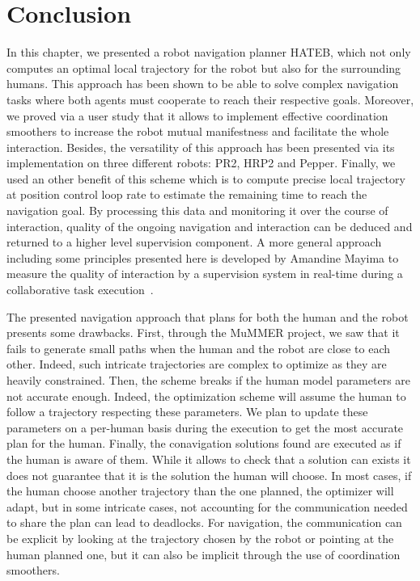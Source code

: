 \documentclass[a4paper,11pt,twoside]{StyleThese}
\begin{document}
\section{Conclusion}

In this chapter, we presented a robot navigation planner HATEB, which not only computes an optimal local trajectory for the robot but also for the surrounding humans. This approach has been shown to be able to solve complex navigation tasks where both agents must cooperate to reach their respective goals. Moreover, we proved via a user study that it allows to implement effective coordination smoothers to increase the robot mutual manifestness and facilitate the whole interaction.
Besides, the versatility of this approach has been presented via its implementation on three different robots: PR2, HRP2 and Pepper.
Finally, we used an other benefit of this scheme which is to compute precise local trajectory at position control loop rate to estimate the remaining time to reach the navigation goal. By processing this data and monitoring it over the course of interaction, quality of the ongoing navigation and interaction can be deduced and returned to a higher level supervision component. A more general approach including some principles presented here is developed by Amandine Mayima to measure the quality of interaction by a supervision system in real-time during a collaborative task execution~\cite{mayima2020toward}.

The presented navigation approach that plans for both the human and the robot presents some drawbacks. First, through the MuMMER project, we saw that it fails to generate small paths when the human and the robot are close to each other. Indeed, such intricate trajectories are complex to optimize as they are heavily constrained. Then, the scheme breaks if the human model parameters are not accurate enough. Indeed, the optimization scheme will assume the human to follow a trajectory respecting these parameters. We plan to update these parameters on a per-human basis during the execution to get the most accurate plan for the human. Finally, the conavigation solutions found are executed as if the human is aware of them. While it allows to check that a solution can exists it does not guarantee that it is the solution the human will choose. In most cases, if the human choose another trajectory than the one planned, the optimizer will adapt, but in some intricate cases, not accounting for the communication needed to share the plan can lead to deadlocks. For navigation, the communication can be explicit by looking at the trajectory chosen by the robot or pointing at the human planned one, but it can also be implicit through the use of coordination smoothers.
\end{document}
